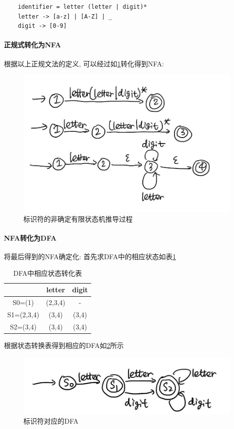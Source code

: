 \documentclass[lang=cn, a4paper]{elegantpaper}
\begin{document}
\begin{lstlisting}
	identifier = letter (letter | digit)*
	letter -> [a-z] | [A-Z] | _
	digit -> [0-9]
\end{lstlisting}

\paragraph{正规式转化为NFA} 根据以上正规文法的定义, 可以经过如\ref{fig: id001}转化得到NFA:

\begin{figure}[H]
	\centering
	\includegraphics[width=0.6\linewidth]{figs/id001.png}
	\caption{标识符的非确定有限状态机推导过程}
	\label{fig: id001}
\end{figure}

\paragraph{NFA转化为DFA} 将最后得到的NFA确定化: 首先求DFA中的相应状态如表\ref{tab: id}

\begin{table}[H]
	\begin{center}
	\centering
	\caption{DFA中相应状态转化表}
	\label{tab: id}
	\begin{tabular}{|c|c|c|}
		\hline
		 & \textbf{letter} & \textbf{digit} \\
		\hline
		S0=(1) & (2,3,4) & - \\
		\hline
		S1=(2,3,4) & (3,4) & (3,4) \\
		\hline
		S2=(3,4) & (3,4) & (3,4) \\
		\hline
	\end{tabular}
	\end{center}
\end{table}

根据状态转换表得到相应的DFA如\ref{fig: id002}所示

\begin{figure}[H]
	\centering
	\includegraphics[width=0.5\linewidth]{figs/id002.png}
	\caption{标识符对应的DFA}
	\label{fig: id002}
\end{figure}
\end{document}

